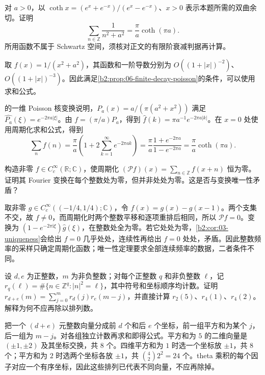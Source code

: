 \begin{exercise}\label{b2:ex:06-rational-sum}
对 \(a>0\)，以 \(\coth x=(e^x+e^{-x})/(e^x-e^{-x})\)、\(x>0\) 表示本题所需的双曲余切。证明
\[
 \sum_{n\in\mathbb Z}\dfrac1{n^2+a^2}
 =\dfrac\pi a\coth(\pi a).
\]
所用函数不属于 Schwartz 空间，须核对正文的有限阶衰减判据再计算。
\end{exercise}
\begin{solution}
取 \(f(x)=1/(x^2+a^2)\)，其函数和一阶导数分别为 \(O((1+|x|)^{-2})\)、\(O((1+|x|)^{-3})\)。因此满足\cref{b2:prop:06-finite-decay-poisson}的条件，可以使用求和公式。

的一维 Poisson 核变换说明，\(P_a(x)=a/(\pi(a^2+x^2))\) 满足 \(\widehat{P_a}(\xi)=e^{-2\pi a|\xi|}\)。由 \(f=(\pi/a)P_a\)，得到 \(\widehat f(k)=\pi a^{-1}e^{-2\pi a|k|}\)。在 \(x=0\) 处使用周期化求和公式，得到
\[
 \sum_nf(n)=\dfrac\pi a\left(1+2\sum_{k=1}^\infty e^{-2\pi ak}\right)
 =\dfrac\pi a\dfrac{1+e^{-2\pi a}}{1-e^{-2\pi a}}
 =\dfrac\pi a\coth(\pi a).
\]
\end{solution}

\begin{exercise}\label{b2:ex:06-periodization-kernel}
构造非零 \(f\in C_c^\infty(\mathbb R;\mathbb C)\)，使周期化 \((\mathcal Pf)(x)=\sum_{n\in\mathbb Z}f(x+n)\) 恒为零。证明其 Fourier 变换在每个整数处为零，但并非处处为零。这是否与变换唯一性矛盾？
\end{exercise}
\begin{solution}
取非零 \(g\in C_c^\infty((-1/4,1/4);\mathbb C)\)，令 \(f(x)=g(x)-g(x-1)\)。两个支集不交，故 \(f\ne0\)，而周期化时两个整数平移和逐项重排后相同，所以 \(\mathcal Pf=0\)。变换为 \((1-e^{-2\pi\mathrm{i}\xi})\widehat g(\xi)\)，在整数处全为零。若它处处为零，\cref{b2:cor:03-uniqueness}会给出 \(f=0\) 几乎处处，连续性再给出 \(f=0\) 处处，矛盾。因此整数频率的采样只确定周期化函数；唯一性定理要求全部连续频率的数据，二者条件不同。
\end{solution}

\begin{exercise}\label{b2:ex:06-squares-count}
设 \(d,e\) 为正整数，\(m\) 为非负整数；对每个正整数 \(q\) 和非负整数 \(\ell\)，记 \(r_q(\ell)=\#\{n\in\mathbb Z^q:|n|^2=\ell\}\)，其中符号和坐标顺序均计数。证明 \(r_{d+e}(m)=\sum_{j=0}^mr_d(j)r_e(m-j)\)，并直接计算 \(r_2(5)\)、\(r_4(1)\)、\(r_4(2)\)。解释为何不应再除以排列数。
\end{exercise}
\begin{solution}
把一个 \((d+e)\) 元整数向量分成前 \(d\) 个和后 \(e\) 个坐标，前一组平方和为某个 \(j\)，后一组为 \(m-j\)。对各组独立计数再求和即得公式。平方和为 \(5\) 的二维向量是 \((\pm1,\pm2)\) 及其坐标交换，共 \(8\) 个。四维平方和为 \(1\) 时选一个坐标放 \(\pm1\)，共 \(8\) 个；平方和为 \(2\) 时选两个坐标各放 \(\pm1\)，共 \(\binom42 2^2=24\) 个。theta 乘积的每个因子对应一个有序坐标，因此这些排列已代表不同向量，不应再除掉。
\end{solution}


